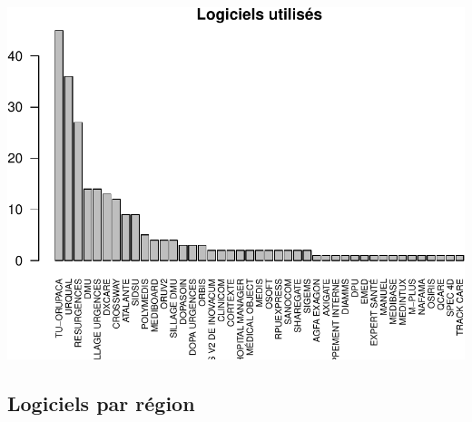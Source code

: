 \documentclass[]{article}
\begin{document}
\includegraphics{septembre2015_files/figure-latex/unnamed-chunk-5-1.pdf}

\subsection{Logiciels par région}\label{logiciels-par-region}
\end{document}
